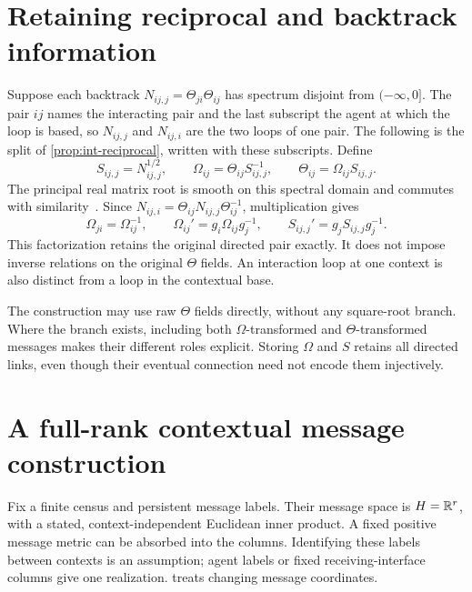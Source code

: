 \section{Retaining reciprocal and backtrack information}

Suppose each backtrack $N_{ij,j}=\Theta_{ji}\Theta_{ij}$ has spectrum disjoint from $(-\infty,0]$. The pair $ij$ names the interacting pair and the last subscript the agent at which the loop is based, so $N_{ij,j}$ and $N_{ij,i}$ are the two loops of one pair. The following is the split of \cref{prop:int-reciprocal}, written with these subscripts. Define
\begin{equation}
 S_{ij,j}=N_{ij,j}^{1/2},\qquad
 \Omega_{ij}=\Theta_{ij}S_{ij,j}^{-1},\qquad
 \Theta_{ij}=\Omega_{ij}S_{ij,j}.
 \label{ibt:eq:reciprocal}
\end{equation}
The principal real matrix root is smooth on this spectral domain and commutes with similarity~\citep{Higham2008}. Since $N_{ij,i}=\Theta_{ij}N_{ij,j}\Theta_{ij}^{-1}$, multiplication gives
\begin{equation}
 \Omega_{ji}=\Omega_{ij}^{-1},\qquad
 \Omega_{ij}'=g_i\Omega_{ij}g_j^{-1},\qquad
 S_{ij,j}'=g_jS_{ij,j}g_j^{-1}.
 \label{ibt:eq:reciprocal-law}
\end{equation}
This factorization retains the original directed pair exactly. It does not impose inverse relations on the original $\Theta$ fields. An interaction loop at one context is also distinct from a loop in the contextual base.

The construction may use raw $\Theta$ fields directly, without any square-root branch. Where the branch exists, including both $\Omega$-transformed and $\Theta$-transformed messages makes their different roles explicit. Storing $\Omega$ and $S$ retains all directed links, even though their eventual connection need not encode them injectively.

\section{A full-rank contextual message construction}
\label{ibt:sec:messages}

Fix a finite census and persistent message labels. Their message space is $H=\mathbb R^r$, with a stated, context-independent Euclidean inner product. A fixed positive message metric can be absorbed into the columns. Identifying these labels between contexts is an assumption; agent labels or fixed receiving-interface columns give one realization.  treats changing message coordinates.

